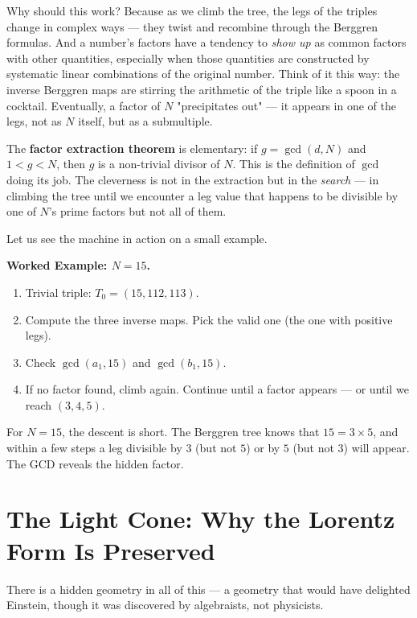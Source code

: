 \documentclass[11pt,twoside,openright]{book}
\theoremstyle{definition}
\theoremstyle{remark}
\begin{document}
Why should this work? Because as we climb the tree, the legs of the triples change in complex ways --- they twist and recombine through the Berggren formulas. And a number's factors have a tendency to \textit{show up} as common factors with other quantities, especially when those quantities are constructed by systematic linear combinations of the original number. Think of it this way: the inverse Berggren maps are stirring the arithmetic of the triple like a spoon in a cocktail. Eventually, a factor of $N$ "precipitates out" --- it appears in one of the legs, not as $N$ itself, but as a submultiple.

The \textbf{factor extraction theorem} is elementary: if $g = \gcd(d, N)$ and $1 < g < N$, then $g$ is a non-trivial divisor of $N$. This is the definition of $\gcd$ doing its job. The cleverness is not in the extraction but in the \textit{search} --- in climbing the tree until we encounter a leg value that happens to be divisible by one of $N$'s prime factors but not all of them.

Let us see the machine in action on a small example.

\textbf{Worked Example: $N = 15$.}

\begin{enumerate}
  \item Trivial triple: $T_0 = (15, 112, 113)$.
  \item Compute the three inverse maps. Pick the valid one (the one with positive legs).
  \item Check $\gcd(a_1, 15)$ and $\gcd(b_1, 15)$.
  \item If no factor found, climb again. Continue until a factor appears --- or until we reach $(3, 4, 5)$.
\end{enumerate}

For $N = 15$, the descent is short. The Berggren tree knows that $15 = 3 \times 5$, and within a few steps a leg divisible by $3$ (but not $5$) or by $5$ (but not $3$) will appear. The GCD reveals the hidden factor.




\section{The Light Cone: Why the Lorentz Form Is Preserved}

There is a hidden geometry in all of this --- a geometry that would have delighted Einstein, though it was discovered by algebraists, not physicists.
\end{document}
